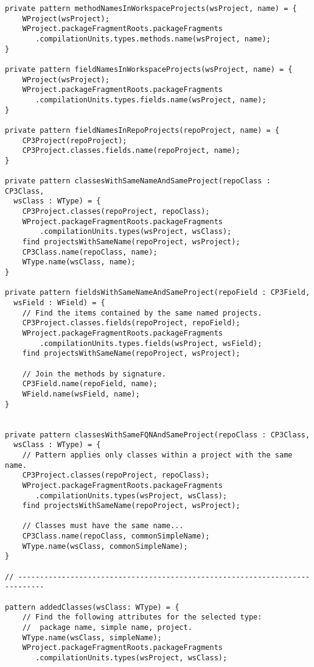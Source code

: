 \begin{lstlisting}
private pattern methodNamesInWorkspaceProjects(wsProject, name) = {
	WProject(wsProject);
	WProject.packageFragmentRoots.packageFragments
	   .compilationUnits.types.methods.name(wsProject, name);
}

private pattern fieldNamesInWorkspaceProjects(wsProject, name) = {
	WProject(wsProject);
	WProject.packageFragmentRoots.packageFragments
	   .compilationUnits.types.fields.name(wsProject, name);
}

private pattern fieldNamesInRepoProjects(repoProject, name) = {
	CP3Project(repoProject);
	CP3Project.classes.fields.name(repoProject, name);
}

private pattern classesWithSameNameAndSameProject(repoClass : CP3Class, 
  wsClass : WType) = {
	CP3Project.classes(repoProject, repoClass);
	WProject.packageFragmentRoots.packageFragments
	    .compilationUnits.types(wsProject, wsClass);
	find projectsWithSameName(repoProject, wsProject);
	CP3Class.name(repoClass, name);
	WType.name(wsClass, name);
}

private pattern fieldsWithSameNameAndSameProject(repoField : CP3Field, 
  wsField : WField) = {
	// Find the items contained by the same named projects.
	CP3Project.classes.fields(repoProject, repoField);
	WProject.packageFragmentRoots.packageFragments
	    .compilationUnits.types.fields(wsProject, wsField);
	find projectsWithSameName(repoProject, wsProject);

	// Join the methods by signature.
	CP3Field.name(repoField, name);
	WField.name(wsField, name);
}


private pattern classesWithSameFQNAndSameProject(repoClass : CP3Class, 
  wsClass : WType) = {
	// Pattern applies only classes within a project with the same name.
	CP3Project.classes(repoProject, repoClass);
	WProject.packageFragmentRoots.packageFragments
	   .compilationUnits.types(wsProject, wsClass);
	find projectsWithSameName(repoProject, wsProject);

	// Classes must have the same name...
	CP3Class.name(repoClass, commonSimpleName);
	WType.name(wsClass, commonSimpleName);
}

// ----------------------------------------------------------------------------

pattern addedClasses(wsClass: WType) = {
	// Find the following attributes for the selected type: 
	//  package name, simple name, project.
	WType.name(wsClass, simpleName);
	WProject.packageFragmentRoots.packageFragments
	   .compilationUnits.types(wsProject, wsClass);


\end{lstlisting}

